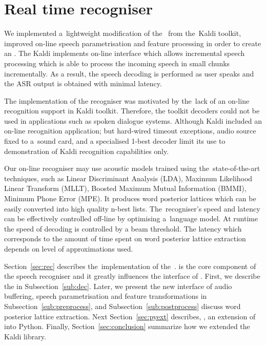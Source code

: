 \chapter{Real time recogniser}
\label{cha:decoder}

We implemented a~lightweight modification of the~ from the~Kaldi toolkit, improved on-line speech parametrisation and feature processing in order to create an .
The Kaldi  implements on-line interface which allows incremental speech processing which is able to process the incoming speech in small chunks incrementally.
As a result, the speech decoding is performed as user speaks and the ASR output is obtained with minimal latency.

The implementation of the recogniser was motivated by the~lack of an on-line recognition support in Kaldi toolkit.
Therefore, the toolkit decoders could not be used in applications such as spoken dialogue systems.
Although Kaldi included an on-line recognition application; but hard-wired timeout exceptions, audio source fixed to a~sound card, and a specialised 1-best decoder limit its use to demonstration of Kaldi recognition capabilities only.

Our on-line recogniser may use acoustic models trained using the~state-of-the-art techniques, 
such as Linear Discriminant Analysis (LDA), Maximum Likelihood Linear Transform (MLLT), Boosted Maximum Mutual Information (BMMI), Minimum Phone Error (MPE).
It produces word posterior lattices which can be easily converted into high quality n-best lists.
The~recogniser's speed and latency can be effectively controlled off-line by optimising a~language model. 
At runtime the speed of decoding is controlled by a beam threshold.
The latency which corresponds to the amount of time spent on word posterior lattice extraction depends on level of approximations used.

Section~\ref{sec:rec} describes the~implementation of the~.
 is the core component of the speech recogniser and it greatly influences the interface of .
First, we describe the  in Subsection~\ref{sub:dec}. 
Later, we present the new interface of audio buffering, speech parametrisation and feature transformations in Subsection~\ref{sub:preprocess}, and Subsection~\ref{sub:postprocess} discuss word posterior lattice extraction.
Next Section~\ref{sec:pyext} describes, , an extension of  into Python.
Finally, Section~\ref{sec:conclusion} summarize how we extended the Kaldi library.


